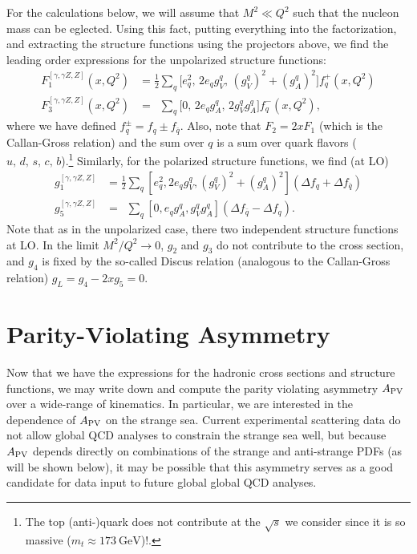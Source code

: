 \documentclass[aps,prd,amsmath,superscriptaddress,floatfix,nofootinbib]{revtex4-2}
\newcommand{\APV}{A_{\rm PV}}
\begin{document}
For the calculations below, we will assume that $M^2 \ll Q^2$ such that the nucleon mass can be eglected.
Using this fact, putting everything into the factorization, and extracting the structure functions using the projectors above, we find the leading order expressions for the unpolarized structure functions:
\begin{align}
\label{eq:unpolarized-LO-structure-functions}
F_{1}^{[\gamma,\gamma Z,Z]}(x,Q^2) &= \frac{1}{2} \sum_{q} \Big[ e_{q}^2, \, 2e_{q}g_{V}^{q}, \, (g_{V}^{q})^2+(g_{A}^{q})^2 \Big] f_{q}^{+}(x,Q^2) \\
F_{3}^{[\gamma,\gamma Z,Z]}(x,Q^2) &= \phantom{\frac{1}{2}} \sum_{q} \Big[ 0, \, 2e_{q}g_{A}^{q}, \, 2g_{V}^{q}g_{A}^{q} \Big] f_{q}^{-}(x,Q^2)
,\end{align}
where we have defined $f^{\pm}_{q} = f_{q} \pm f_{\bar{q}}$.
Also, note that $F_{2} = 2xF_{1}$ (which is the Callan-Gross relation) and the sum over $q$ is a sum over quark flavors ($u,\, d, \, s, \, c, \, b$).\footnote{The top (anti-)quark does not contribute at the $\sqrt{s}$ we consider since it is so massive ($m_{t} \approx \SI{173}{\GeV}$)!.}
Similarly, for the polarized structure functions, we find (at LO)
\begin{align}
    g_1^{[ \gamma, \gamma Z, Z ]} &= \frac{1}{2} \sum_{q} [e_{q}^2,2 e_{q} g_{V}^{q},(g_{V}^{q})^2 + (g_{A}^{q})^2] (\Delta f_q + \Delta f_{\bar{q}}) \\
    g_5^{[ \gamma, \gamma Z, Z ]} &= \phantom{\frac{1}{2}} \sum_{q} [0,e_{q} g_{A}^{q},g_{V}^{q} g_{A}^{q}] (\Delta f_{\bar{q}} - \Delta f_{q})
.\end{align}
Note that as in the unpolarized case, there two independent structure functions at LO.
In the limit $M^2/Q^2 \rightarrow 0$, $g_2$ and $g_3$ do not contribute to the cross section, and $g_4$ is fixed by the so-called Discus relation (analogous to the Callan-Gross relation) $g_{L} = g_{4} - 2x g_{5} = 0$.

\section{Parity-Violating Asymmetry}
\label{sec:parity-violating-asymmetry}

Now that we have the expressions for the hadronic cross sections and structure functions, we may write down and compute the parity violating asymmetry $\APV$ over a wide-range of kinematics.
In particular, we are interested in the dependence of $\APV$ on the strange sea.
Current experimental scattering data do not allow global QCD analyses to constrain the strange sea well, but because $\APV$ depends directly on combinations of the strange and anti-strange PDFs (as will be shown below), it may be possible that this asymmetry serves as a good candidate for data input to future global global QCD analyses.
\end{document}
